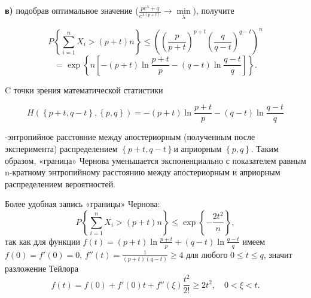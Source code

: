 \begin{problem}
\begin{ordre}
\noindent \textbf{в)} подобрав оптимальное значение ($\frac{pe^{\lambda } +q}{e^{\lambda (p+t)} } \to \mathop{\min }\limits_{\lambda } $), получите 

\[
P\left\{\sum _{i=1}^{n}X_{i} >(p+t)n \right\}\le \left(\left(\frac{p}{p+t} \right)^{p+t} \left(\frac{q}{q-t} \right)^{q-t} \right)^{n} 
\]
\[
= \exp \left\{n\left[-(p+t)\ln \frac{p+t}{p} -(q-t)\ln \frac{q-t}{q} \right]\right\}.
\] 


\end{ordre}

\begin{remark}
C точки зрения математической статистики 

\[
H\left(\left\{p+t,q-t\right\},\left\{p,q\right\}\right)=-(p+t)\ln \frac{p+t}{p} -(q-t)\ln \frac{q-t}{q} 
\]

-энтропийное расстояние между апостериорным (полученным после эксперимента) распределением $\left\{p+t,q-t\right\}$и априорным $\left\{p,q\right\}$. Таким образом, «граница» Чернова уменьшается экспоненциально с показателем равным n-кратному энтропийному расстоянию между апостериорным и априорным распределением вероятностей.\textbf{}

\noindent Более удобная запись «границы» Чернова:
\[P\left\{\sum _{i=1}^{n}X_{i} >(p+t)n \right\}\le \exp \left\{-\frac{2t^{2} }{n} \right\},\] 
так как для функции $f(t)=(p+t)\ln \frac{p+t}{p} +(q-t)\ln \frac{q-t}{q} $ имеем $f(0)=f'(0)=0$, $f''(t)=\frac{1}{(p+t)(q-t)} \ge 4$ для любого $0\le t\le q$, значит разложение Тейлора 
\[f(t)=f(0)+f'(0)t+f''(\xi )\frac{t^{2} }{2!} \ge 2t^{2} ,\quad 0<\xi <t.\]

\end{remark}

\end{problem}

